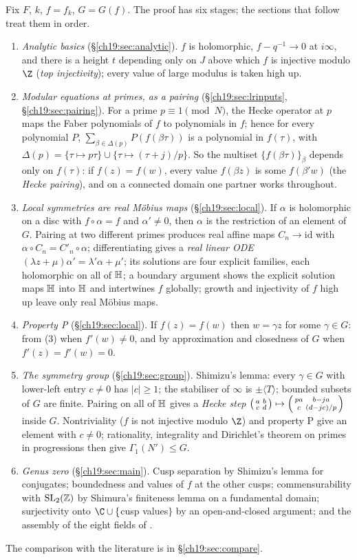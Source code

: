 Fix $F$, $k$, $f=f_k$, $G=G(f)$.  The proof has six stages; the sections that follow treat them in order.
\begin{enumerate}[label=(\arabic*)]
\item \emph{Analytic basics} (\S\ref{ch19:sec:analytic}).  $f$ is holomorphic, $f-q^{-1}\to0$ at $i\infty$, and there is a height
  $t$ depending only on $J$ above which $f$ is injective modulo $\Z$ (\emph{top injectivity}); every value of large modulus is
  taken high up.
\item \emph{Modular equations at primes, as a pairing} (\S\ref{ch19:sec:lrinputs}, \S\ref{ch19:sec:pairing}).  For a prime
  $p\equiv1\pmod N$, the Hecke operator at $p$ maps the Faber polynomials of $f$ to polynomials in $f$; hence for every
  polynomial $P$, $\sum_{\beta\in\Delta(p)}P(f(\beta\tau))$ is a polynomial in $f(\tau)$, with $\Delta(p)=\{\tau\mapsto p\tau\}\cup
  \{\tau\mapsto(\tau+j)/p\}$.  So the multiset $\{f(\beta\tau)\}_\beta$ depends only on $f(\tau)$: if $f(z)=f(w)$, every value
  $f(\beta z)$ is some $f(\beta'w)$ (the \emph{Hecke pairing}), and on a connected domain one partner works throughout.
\item \emph{Local symmetries are real M\"obius maps} (\S\ref{ch19:sec:local}).  If $\alpha$ is holomorphic on a disc with
  $f\circ\alpha=f$ and $\alpha'\ne0$, then $\alpha$ is the restriction of an element of $G$.  Pairing at two different primes
  produces real affine maps $C_n\to\mathrm{id}$ with $\alpha\circ C_n=C'_n\circ\alpha$; differentiating gives a \emph{real linear ODE}
  $(\lambda z+\mu)\alpha'=\lambda'\alpha+\mu'$; its solutions are four explicit families, each holomorphic on all of $\mathbb{H}$; a
  boundary argument shows the explicit solution maps $\mathbb{H}$ into $\mathbb{H}$ and intertwines $f$ globally; growth and
  injectivity of $f$ high up leave only real M\"obius maps.
\item \emph{Property P} (\S\ref{ch19:sec:local}).  If $f(z)=f(w)$ then $w=\gamma z$ for some $\gamma\in G$: from (3) when $f'(w)\ne0$,
  and by approximation and closedness of $G$ when $f'(z)=f'(w)=0$.
\item \emph{The symmetry group} (\S\ref{ch19:sec:group}).  Shimizu's lemma: every $\gamma\in G$ with lower-left entry $c\ne0$ has
  $|c|\ge1$; the stabiliser of $\infty$ is $\pm\langle T\rangle$; bounded subsets of $G$ are finite.  Pairing on all of $\mathbb{H}$
  gives a \emph{Hecke step} $\left(\begin{smallmatrix}a&b\\c&d\end{smallmatrix}\right)\mapsto\left(\begin{smallmatrix}pa&b-ja\\c&(d-jc)/p\end{smallmatrix}\right)$ inside $G$.  Nontriviality ($f$ is not injective
  modulo $\Z$) and property P give an element with $c\ne0$; rationality, integrality and Dirichlet's theorem on primes in
  progressions then give $\Gamma_1(N')\le G$.
\item \emph{Genus zero} (\S\ref{ch19:sec:main}).  Cusp separation by Shimizu's lemma for conjugates; boundedness and values
  of $f$ at the other cusps; commensurability with $\mathrm{SL}_2(\mathbb{Z})$ by Shimura's finiteness lemma on a fundamental domain;
  surjectivity onto $\C\cup\{$cusp values$\}$ by an open-and-closed argument; and the assembly of the eight fields of
  .
\end{enumerate}
The comparison with the literature is in \S\ref{ch19:sec:compare}.

